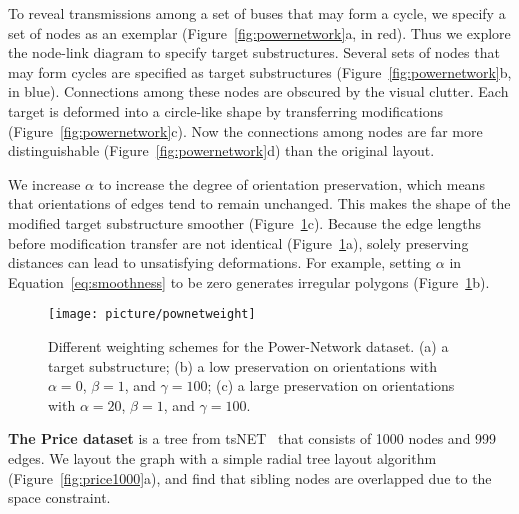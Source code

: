 To reveal transmissions among a set of buses that may form a cycle, we specify a set of nodes as an exemplar (Figure~\ref{fig:powernetwork}a, in red). 
Thus we explore the node-link diagram to specify target substructures. Several sets of nodes that may form cycles are specified as target substructures (Figure~\ref{fig:powernetwork}b, in blue). Connections among these nodes are obscured by the visual clutter.  Each target is deformed into a circle-like shape by transferring modifications (Figure~\ref{fig:powernetwork}c). Now the connections among nodes are far more distinguishable (Figure~\ref{fig:powernetwork}d) than the original layout.

We increase $\alpha$ to increase the degree of orientation preservation, which means that orientations of edges tend to remain unchanged. This makes the shape of the modified target substructure smoother (Figure~\ref{fig:pownetweight}c).
Because the edge lengths before modification transfer are not identical (Figure~\ref{fig:pownetweight}a), solely preserving distances can lead to unsatisfying deformations. For example, setting $\alpha$ in Equation~\ref{eq:smoothness} to be zero generates irregular polygons (Figure~\ref{fig:pownetweight}b).

\begin{figure}[!tp]
    \centering
    \setlength{\belowcaptionskip}{-5pt}
    \texttt{[image: picture/pownetweight]}
    \caption{Different weighting schemes for the Power-Network dataset. (a) a target substructure; (b) a low preservation on orientations with $\alpha = 0$, $\beta = 1$, and $\gamma = 100$; (c) a large preservation on orientations with $\alpha = 20$, $\beta = 1$, and $\gamma = 100$.}
    \label{fig:pownetweight}
\end{figure}


\textbf{The Price dataset} is a tree from tsNET~\cite{DBLP:journals/cgf/KruigerRMKKT17} that consists of 1000 nodes and 999 edges. We layout the graph with a simple radial tree layout algorithm~\cite{DBLP:conf/infovis/Jankun-KellyM03} (Figure~\ref{fig:price1000}a), and find that sibling nodes are overlapped due to the space constraint. 

